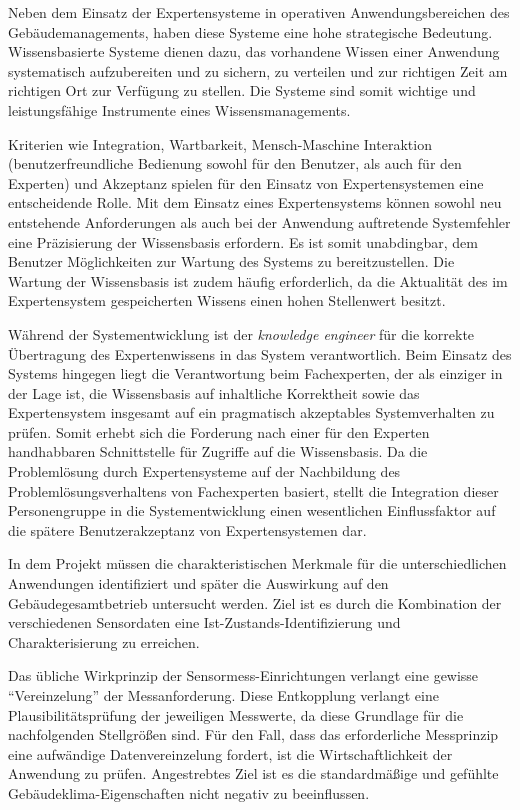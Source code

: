 Neben dem Einsatz der Expertensysteme in operativen Anwendungsbereichen des Gebäudemanagements, haben diese Systeme eine hohe strategische Bedeutung. Wissensbasierte Systeme dienen dazu, das vorhandene Wissen einer Anwendung systematisch aufzubereiten und zu sichern, zu verteilen und zur richtigen Zeit am richtigen Ort zur Verfügung zu stellen. Die Systeme sind somit wichtige und leistungsfähige Instrumente eines Wissensmanagements.

Kriterien wie Integration, Wartbarkeit, Mensch-Maschine Interaktion (benutzerfreundliche Bedienung sowohl für den Benutzer, als auch für den Experten) und Akzeptanz spielen für den Einsatz von Expertensystemen eine entscheidende Rolle. Mit dem Einsatz eines Expertensystems können sowohl neu entstehende Anforderungen als auch bei der Anwendung auftretende Systemfehler eine Präzisierung der Wissensbasis erfordern.  Es ist somit unabdingbar, dem Benutzer Möglichkeiten zur Wartung des Systems zu bereitzustellen. Die Wartung der Wissensbasis ist zudem häufig erforderlich, da die Aktualität des im Expertensystem gespeicherten Wissens einen hohen Stellenwert besitzt.

Während der Systementwicklung ist der \textit{knowledge engineer} für die korrekte Übertragung des Expertenwissens in das System verantwortlich. Beim Einsatz des Systems hingegen liegt die Verantwortung beim Fachexperten, der als einziger in der Lage ist, die Wissensbasis auf inhaltliche Korrektheit sowie das Expertensystem insgesamt auf ein pragmatisch akzeptables Systemverhalten zu prüfen. Somit erhebt sich die Forderung nach einer für den Experten handhabbaren Schnittstelle für Zugriffe auf die Wissensbasis. Da die Problemlösung durch Expertensysteme auf der Nachbildung des Problemlösungsverhaltens von Fachexperten basiert, stellt die Integration dieser Personengruppe in die Systementwicklung einen wesentlichen Einflussfaktor auf die spätere Benutzerakzeptanz von Expertensystemen dar.

In dem Projekt müssen die charakteristischen Merkmale für die unterschiedlichen Anwendungen identifiziert und später die Auswirkung auf den Gebäudegesamtbetrieb untersucht werden. Ziel ist es durch die Kombination der verschiedenen Sensordaten eine Ist-Zustands-Identifizierung und Charakterisierung zu erreichen.

Das übliche Wirkprinzip der Sensormess-Einrichtungen verlangt eine gewisse \enquote{Vereinzelung} der Messanforderung. Diese Entkopplung verlangt eine Plausibilitätsprüfung der jeweiligen Messwerte, da diese Grundlage für die nachfolgenden Stellgrößen sind. Für den Fall, dass das erforderliche Messprinzip eine aufwändige Datenvereinzelung fordert, ist die Wirtschaftlichkeit der Anwendung zu prüfen. Angestrebtes Ziel ist es die standardmäßige und gefühlte Gebäudeklima-Eigenschaften nicht negativ zu beeinflussen.


